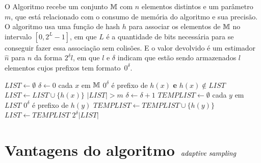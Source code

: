 O Algoritmo  recebe um conjunto $\mathbb{M}$ com $n$ elementos distintos e um parâmetro $m$, que está 
relacionado com o consumo de memória do algoritmo e sua precisão. O algoritmo usa uma função de hash $h$ para associar 
os elementos de $\mathbb{M}$ no intervalo $[0, 2^L - 1]$, em que $L$ é a quantidade de bits necessária para se conseguir fazer 
essa associação sem colisões. E o valor devolvido é um estimador~$\hat{n}$ para $n$ da forma $2^{\delta} l$, em que $l$ 
e $\delta$ indicam que estão sendo armazenados $l$ elementos cujos prefixos tem formato~$0^{\delta}$.

\begin{codebox}
  \li $LIST \gets \emptyset$
  \li $\delta \gets 0$
  \li \For cada $x$ em $\mathbb{M}$ 
  \li    \Do 
         \If $0^{\delta}$ é prefixo de $h(x)$ \textbf{e} $h(x) \not\in LIST$
  \li             \Then $LIST \gets LIST \cup \{ h(x) \}$
         \End
  \li    \While $|LIST| > m$
  \li    \Do
         $\delta \gets \delta + 1$
  \li    $TEMPLIST \gets \emptyset$
  \li    \For cada $y$ em $LIST$
  \li    \Do
            \If $0^{\delta}$ é prefixo de $h(y)$
  \li       \Then $TEMPLIST \gets TEMPLIST \cup \{ h(y) \}$
            \End
         \End
  \li    $LIST \gets TEMPLIST$
         \End 
      \End
  \li
  \Return $2^{\delta} |LIST|$   
  \End
\end{codebox}


\section{Vantagens do algoritmo $\textit{adaptive sampling}$}
\label{lab:chapter:04:02}

